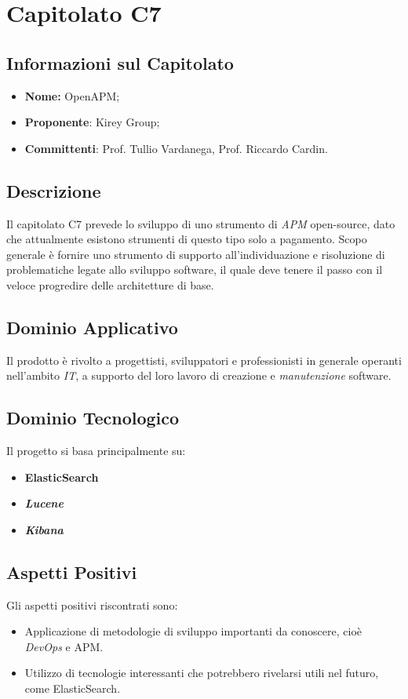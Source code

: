 \section{Capitolato C7}
\subsection{Informazioni sul Capitolato}
	\begin{itemize}
		\item \textbf{Nome:}
		OpenAPM;
		\item \textbf{Proponente}:
		Kirey Group;
		\item \textbf{Committenti}:
		Prof. Tullio Vardanega, Prof. Riccardo Cardin.
	\end{itemize}

\subsection{Descrizione}
	Il capitolato C7 prevede lo sviluppo di uno strumento di \textit{APM} open-source, dato che attualmente esistono strumenti di questo tipo solo a pagamento. Scopo generale è fornire uno strumento di supporto all'individuazione e risoluzione di problematiche legate allo sviluppo software, il quale deve tenere il passo con il veloce progredire delle architetture di base.
		
\subsection{Dominio Applicativo}
	Il prodotto è rivolto a progettisti, sviluppatori e professionisti in generale operanti nell'ambito \textit{IT}, a supporto del loro lavoro di creazione e \textit{manutenzione} software. 

\subsection{Dominio Tecnologico}
	Il progetto si basa principalmente su:
		\begin{itemize}
			\item \textbf{ElasticSearch}
			\item \textit{\textbf{Lucene}}
			\item \textit{\textbf{Kibana}}
		\end{itemize}

\subsection{Aspetti Positivi}
	Gli aspetti positivi riscontrati sono:
	\begin{itemize}
	\item Applicazione di metodologie di sviluppo importanti da conoscere, cioè \textit{DevOps} e APM.
	\item Utilizzo di tecnologie interessanti che potrebbero rivelarsi utili nel futuro, come ElasticSearch.
	\end{itemize}

